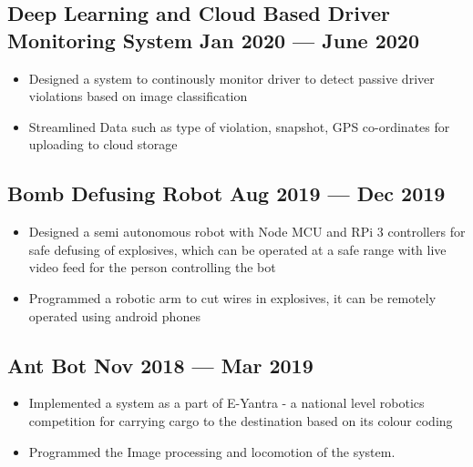 \documentclass[a4,10pt]{article}
\newenvironment{zitemize}{
\begin{itemize}\itemsep0pt \parskip0pt \parsep1pt}
{\end{itemize}\vspace{-0.5cm}}
\begin{document}
\subsection*{Deep Learning and Cloud Based Driver Monitoring System \hfill Jan 2020 --- June 2020} 
    \begin{zitemize}
        \item Designed a system to continously monitor driver to detect passive driver violations based on image classification 
        \item Streamlined Data such as type of violation, snapshot, GPS co-ordinates for uploading to cloud storage
    \end{zitemize}


\subsection*{Bomb Defusing Robot \hfill Aug 2019 --- Dec 2019} 
    \begin{zitemize}
        \item Designed a semi autonomous robot with Node MCU and RPi 3 controllers for safe defusing of explosives, which can be operated at a safe range with live video feed for the person controlling the bot
        \item Programmed a robotic arm to cut wires in explosives, it can be remotely operated using android phones
    \end{zitemize}


\subsection*{Ant Bot \hfill Nov 2018 --- Mar 2019} 
    \begin{zitemize}
        \item Implemented a system as a part of E-Yantra - a national level robotics competition for carrying cargo to the destination based on its colour coding
        \item Programmed the Image processing and locomotion of the system.  
    \end{zitemize}
    
\end{document}
